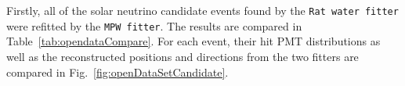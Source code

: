 Firstly, all of the solar neutrino candidate events found by the \texttt{Rat water fitter} were refitted by the \texttt{MPW fitter}. The results are compared in Table~\ref{tab:opendataCompare}. For each event, their hit PMT distributions as well as the reconstructed positions and directions from the two fitters are compared in Fig.~\ref{fig:openDataSetCandidate}. 

\begin{figure}[htbp]
	\centering
\end{figure}
